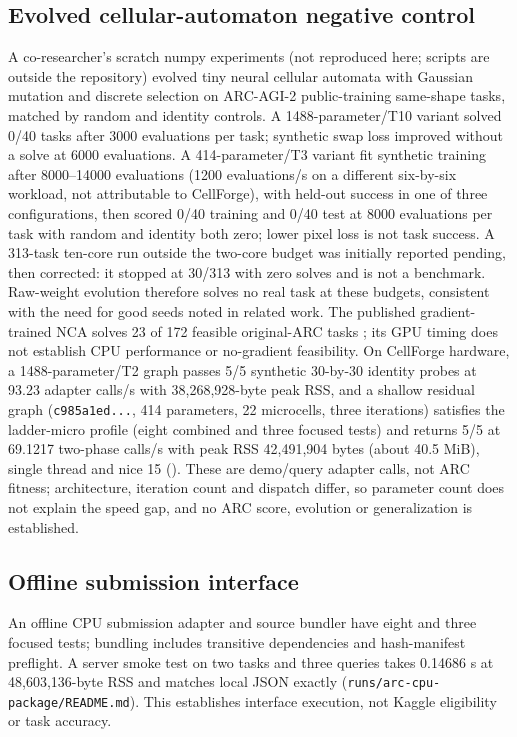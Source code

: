\documentclass[11pt]{article}
\begin{document}
\subsection{Evolved cellular-automaton negative control}\label{sec:nca}
A co-researcher's scratch numpy experiments (not reproduced here; scripts are outside the
repository) evolved tiny neural cellular automata with Gaussian mutation and discrete selection on
ARC-AGI-2 public-training same-shape tasks, matched by random and identity controls. A
1488-parameter/T10 variant solved 0/40 tasks after 3000 evaluations per task; synthetic swap loss
improved without a solve at 6000 evaluations. A 414-parameter/T3 variant fit synthetic training
after 8000--14000 evaluations (1200 evaluations/s on a different six-by-six workload, not
attributable to CellForge), with held-out success in one of three configurations, then scored
0/40 training and 0/40 test at 8000 evaluations per task with random and identity both zero; lower
pixel loss is not task success. A 313-task ten-core run outside the two-core budget was
initially reported pending, then corrected: it stopped at 30/313 with zero solves and is not a
benchmark. Raw-weight evolution therefore solves no real task at these budgets, consistent with the
need for good seeds noted in related work. The published gradient-trained NCA solves 23 of 172
feasible original-ARC tasks \cite{xu2025nca}; its GPU timing does not establish CPU performance or
no-gradient feasibility. On CellForge hardware, a 1488-parameter/T2 graph passes 5/5 synthetic
30-by-30 identity probes at 93.23 adapter calls/s with 38{,}268{,}928-byte peak RSS, and a shallow
residual graph (\texttt{c985a1ed...}, 414 parameters, 22 microcells, three iterations) satisfies the
ladder-micro profile (eight combined and three focused tests) and returns 5/5 at 69.1217 two-phase
calls/s with peak RSS 42{,}491{,}904 bytes (about 40.5 MiB), single thread and nice 15
(). These are demo/query adapter calls, not ARC
fitness; architecture, iteration count and dispatch differ, so parameter count does not explain the
speed gap, and no ARC score, evolution or generalization is established.

\subsection{Offline submission interface}
An offline CPU submission adapter and source bundler have eight and three focused tests; bundling
includes transitive dependencies and hash-manifest preflight. A server smoke test on two tasks and
three queries takes 0.14686 s at 48{,}603{,}136-byte RSS and matches local JSON exactly
(\texttt{runs/arc-cpu-package/README.md}). This establishes interface execution, not Kaggle
eligibility or task accuracy.
\end{document}
